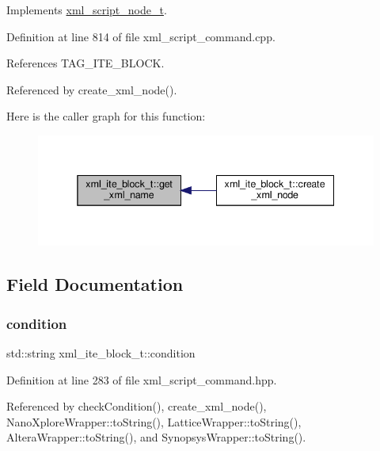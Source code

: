 Implements \hyperlink{classxml__script__node__t_af5815fab8924e5e4f47ba1b7266b6cb8}{xml\+\_\+script\+\_\+node\+\_\+t}.



Definition at line 814 of file xml\+\_\+script\+\_\+command.\+cpp.



References T\+A\+G\+\_\+\+I\+T\+E\+\_\+\+B\+L\+O\+CK.



Referenced by create\+\_\+xml\+\_\+node().

Here is the caller graph for this function\+:
\nopagebreak
\begin{figure}[H]
\begin{center}
\leavevmode
\includegraphics[width=338pt]{df/d5b/classxml__ite__block__t_a82a199264ab67116550596a27ff2b051_icgraph}
\end{center}
\end{figure}


\subsection{Field Documentation}
\mbox{\label{classxml__ite__block__t_ad7d8d5a0321dac3cc6e74e55411665f2}} 
\subsubsection{\texorpdfstring{condition}{condition}}
{\footnotesize\ttfamily std\+::string xml\+\_\+ite\+\_\+block\+\_\+t\+::condition}



Definition at line 283 of file xml\+\_\+script\+\_\+command.\+hpp.



Referenced by check\+Condition(), create\+\_\+xml\+\_\+node(), Nano\+Xplore\+Wrapper\+::to\+String(), Lattice\+Wrapper\+::to\+String(), Altera\+Wrapper\+::to\+String(), and Synopsys\+Wrapper\+::to\+String().

